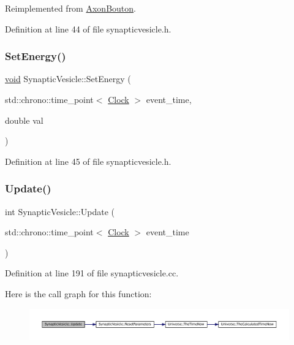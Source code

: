 Reimplemented from \mbox{\hyperlink{class_axon_bouton_afe285478d414f2815afb98abe7b92898}{Axon\+Bouton}}.



Definition at line 44 of file synapticvesicle.\+h.

\mbox{\label{class_synaptic_vesicle_ac98f9c8ccaabbccc38151c51d204dfec}} 
\subsubsection{\texorpdfstring{Set\+Energy()}{SetEnergy()}}
{\footnotesize\ttfamily \mbox{\hyperlink{glad_8h_a950fc91edb4504f62f1c577bf4727c29}{void}} Synaptic\+Vesicle\+::\+Set\+Energy (\begin{DoxyParamCaption}\item[{std\+::chrono\+::time\+\_\+point$<$ \mbox{\hyperlink{universe_8h_a0ef8d951d1ca5ab3cfaf7ab4c7a6fd80}{Clock}} $>$}]{event\+\_\+time,  }\item[{double}]{val }\end{DoxyParamCaption})\hspace{0.3cm}{\ttfamily [inline]}}



Definition at line 45 of file synapticvesicle.\+h.

\mbox{\label{class_synaptic_vesicle_a49c8e82147e634c83f7b4c3ef9894e2d}} 
\subsubsection{\texorpdfstring{Update()}{Update()}}
{\footnotesize\ttfamily int Synaptic\+Vesicle\+::\+Update (\begin{DoxyParamCaption}\item[{std\+::chrono\+::time\+\_\+point$<$ \mbox{\hyperlink{universe_8h_a0ef8d951d1ca5ab3cfaf7ab4c7a6fd80}{Clock}} $>$}]{event\+\_\+time }\end{DoxyParamCaption})}



Definition at line 191 of file synapticvesicle.\+cc.

Here is the call graph for this function\+:\nopagebreak
\begin{figure}[H]
\begin{center}
\leavevmode
\includegraphics[width=350pt]{class_synaptic_vesicle_a49c8e82147e634c83f7b4c3ef9894e2d_cgraph}
\end{center}
\end{figure}


